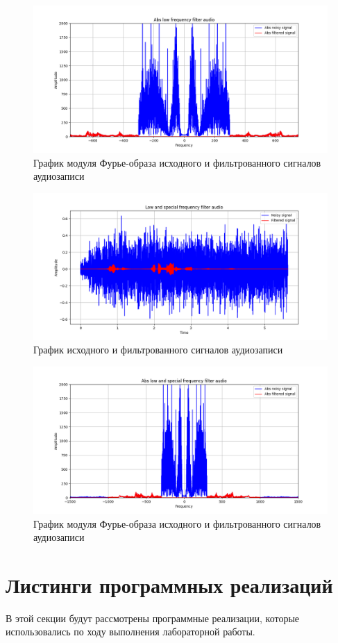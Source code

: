 \documentclass[a4paper, 12pt]{article}
\begin{document}
    \begin{figure}[!htb]
        \centering
        \includegraphics[scale=0.485]{abs_u_U_audio.png}
        \captionsetup{skip=0pt}
        \caption{График модуля Фурье-образа исходного и фильтрованного сигналов аудиозаписи}
        \label{fig:fig114}
    \end{figure}
    \begin{figure}[!htb]
        \centering
        \includegraphics[scale=0.485]{u_flt_u_audio_v2.png}
        \captionsetup{skip=0pt}
        \caption{График исходного и фильтрованного сигналов аудиозаписи}
        \label{fig:fig115}
    \end{figure}
    \begin{figure}[!htb]
        \centering
        \includegraphics[scale=0.485]{abs_u_U_audio_v2.png}
        \captionsetup{skip=0pt}
        \caption{График модуля Фурье-образа исходного и фильтрованного сигналов аудиозаписи}
        \label{fig:fig116}
    \end{figure}


    \section{Листинги программных реализаций}
    В этой секции будут рассмотрены программные реализации, которые использовались по ходу выполнения лабораторной работы.
\end{document}
